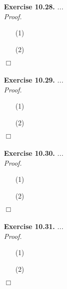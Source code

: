 \documentclass{article}
\begin{document}



\textbf{Exercise 10.28.}
\emph{...} \\

\emph{Proof.}
\begin{enumerate}
\item[(1)]
\item[(2)]

\end{enumerate}
$\Box$ \\\\






\textbf{Exercise 10.29.}
\emph{...} \\

\emph{Proof.}
\begin{enumerate}
\item[(1)]
\item[(2)]

\end{enumerate}
$\Box$ \\\\






\textbf{Exercise 10.30.}
\emph{...} \\

\emph{Proof.}
\begin{enumerate}
\item[(1)]
\item[(2)]

\end{enumerate}
$\Box$ \\\\





\textbf{Exercise 10.31.}
\emph{...} \\

\emph{Proof.}
\begin{enumerate}
\item[(1)]
\item[(2)]

\end{enumerate}
$\Box$ \\\\
\end{document}
